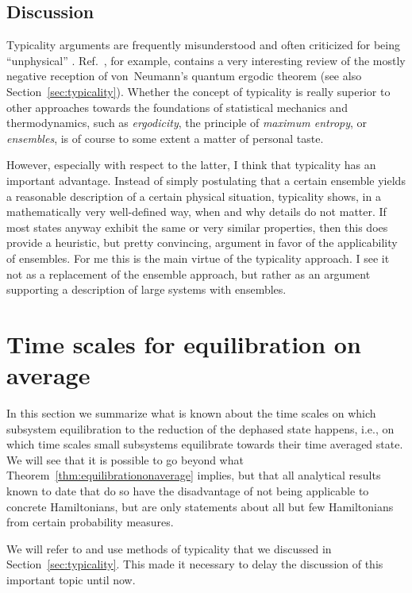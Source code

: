 \documentclass[a4paper,12pt,listof=totoc,index=totoc,bibliography=totoc,headsepline=false,headings=normal,BCOR16.153846mm,DIV12,headinclude,twoside,cleardoublepage=empty,numbers=noenddot,final]{scrreprt}
\theoremstyle{mystyle}
\numberwithin{equation}{section}
\numberwithin{figure}{section}
\numberwithin{lemma}{section}
\numberwithin{theorem}{section}
\numberwithin{corollary}{section}
\numberwithin{definition}{section}
\numberwithin{conjecture}{section}
\numberwithin{observation}{section}
\newcommand{\+}{\mkern2mu}
\DeclareMathOperator{\1}{\mathds{1}}
\begin{document}
\subsection*{Discussion}
%
Typicality arguments are frequently misunderstood and often criticized for being ``unphysical'' \cite{Bocchieri1958,Farquhar1957}.
Ref.~\cite{0907.0108v1}, for example, contains a very interesting review of the mostly negative reception of von~Neumann's quantum ergodic theorem (see also Section~\ref{sec:typicality}).
Whether the concept of typicality is really superior to other approaches towards the foundations of statistical mechanics and thermodynamics, such as \emph{ergodicity}, the principle of \emph{maximum entropy}, or \emph{ensembles}, is of course to some extent a matter of personal taste.

However, especially with respect to the latter, I think that typicality has an important advantage.
Instead of simply postulating that a certain ensemble yields a reasonable description of a certain physical situation, typicality shows, in a mathematically very well-defined way, when and why details do not matter.
If most states anyway exhibit the same or very similar properties, then this does provide a heuristic, but pretty convincing, argument in favor of the applicability of ensembles.
For me this is the main virtue of the typicality approach.
I see it not as a replacement of the ensemble approach, but rather as an argument supporting a description of large systems with ensembles.


\section{Time scales for equilibration on average}
\label{sec:timescales}
%
In this section we summarize what is known about the time scales on which subsystem equilibration to the reduction of the dephased state happens, i.e., on which time scales small subsystems equilibrate towards their time averaged state.
We will see that it is possible to go beyond what Theorem~\ref{thm:equilibrationonaverage} implies, but that all analytical results known to date that do so have the disadvantage of not being applicable to concrete Hamiltonians, but are only statements about all but few Hamiltonians from certain probability measures.

We will refer to and use methods of typicality that we discussed in Section~\ref{sec:typicality}.
This made it necessary to delay the discussion of this important topic until now.
\end{document}
